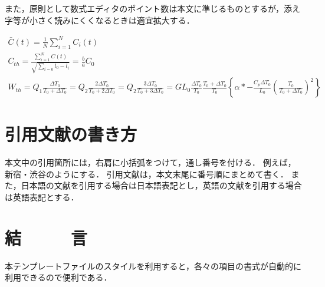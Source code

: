 \documentclass[a4paper, 10pt, dvips, fleqn, uplatex]{jsarticle}
\begin{document}
また，原則として数式エディタのポイント数は本文に準じるものとするが，添え字等が小さく読みにくくなるときは適宜拡大する．

\begin{gather}
  \bar{C}(t) = \frac{1}{N}\sum^{N}_{i=1}{C_{i}(t)} \\
  C_{th} = \frac{\displaystyle \sum^{N}_{i=1}{C(t)}}{\sqrt{\displaystyle \sum^{}_{i=0}{l_{0}-l_{i}}}}
  = \frac{b}{a}C_{0} \\
  W_{th} = Q_{1}\frac{\Delta T_{0}}{T_{0} + \Delta T_{0}}
  = Q_{2}\frac{2\Delta T_{0}}{T_{0} + 2\Delta T_{0}}
  = Q_{2}\frac{3\Delta T_{0}}{T_{0} + 3\Delta T_{0}}
  = GL_{0}\frac{\Delta T_{0}}{T_{0}}\frac{T_{0} + \Delta T_{0}}{T_{0}}
  \left\{ \alpha \ast -\frac{C_{p}\Delta T_{0}}{L_{0}}
  \left( \frac{T_{0}}{T_{0} + \Delta T_{0}} \right)^{2} \right\}
\end{gather}


\section{引用文献の書き方}

本文中の引用箇所には，右肩に小括弧をつけて，通し番号を付ける．
例えば，新宿・渋谷\supercite{shinjuku,keer}のようにする．
引用文献は，本文末尾に番号順にまとめて書く．
また，日本語の文献を引用する場合は日本語表記とし，英語の文献を引用する場合は英語表記とする．


\section{結　　　言}

本テンプレートファイルのスタイルを利用すると，各々の項目の書式が自動的に利用できるので便利である．


\printbibliography[title=文　　　献]
\end{document}
